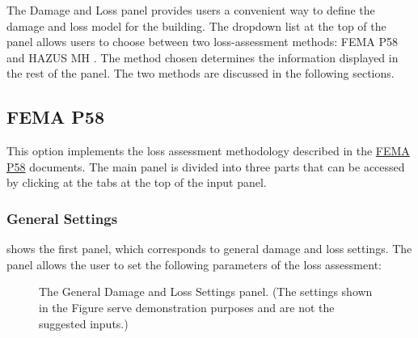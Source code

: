 The Damage and Loss panel provides users a convenient way to define the damage and loss model for the building. The dropdown list at the top of the panel allows users to choose between two loss-assessment methods: FEMA P58 \cite{applied_technology_council_atc_fema_2012} and HAZUS MH \cite{federal_emergency_management_agency_fema_hazus_2018-2}. The method chosen determines the information displayed in the rest of the panel. The two methods are discussed in the following sections.

\subsection{FEMA P58}

This option implements the loss assessment methodology described in the \href{https://www.fema.gov/media-library/assets/documents/90380}{FEMA P58} documents. The main panel is divided into three parts that can be accessed by clicking at the tabs at the top of the input panel.

\subsubsection{General Settings}

 shows the first panel, which corresponds to general damage and loss settings. The panel allows the user to set the following parameters of the loss assessment:

\begin{figure}[!htbp]
  \caption{The General Damage and Loss Settings panel. (The settings shown in the Figure serve demonstration purposes and are not the suggested inputs.)}
  \label{fig:dl_p58_general}
\end{figure}

